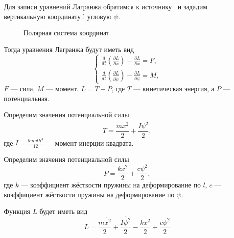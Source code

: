 \documentclass[a4paper,14pt]{extarticle}
\begin{document}
Для записи уравнений Лагранжа обратимся к источнику~\cite{itmo} и зададим вертикальную координату l угловую $\psi$.
\begin{figure}[!htbp]
	\caption{Полярная система координат}
	\label{Polar_coordinate_components}
\end{figure}

Тогда уравнения Лагранжа будут иметь вид
\begin{equation}
	\begin{cases*}
	\frac{d}{dt} \left(\frac{\partial L}{\partial \dot{x}} \right) - \frac{\partial L}{\partial x} = F, \\
	\frac{d}{dt} \left(\frac{\partial L}{\partial \dot{\psi}} \right) - \frac{\partial L}{\partial \psi} = M,
	\end{cases*}
\label{lagrange}
\end{equation}
$F$ --- сила, $M$ --- момент. $L =  T - P$, где $T$ --- кинетическая энергия, а $P$ --- потенциальная.

\noindent Определим значения потенциальной силы
\begin{equation*}
	T = \frac{m \dot{x^2}}{2} + \frac{I \dot{\psi^2}}{2},
\end{equation*}
где $I = \frac{length^4}{12}$ --- момент инерции квадрата.

\noindent Определим значения потенциальной силы
\begin{equation*}
	P = \frac{k {x^2}}{2} +\frac{c {\psi^2}}{2},
\end{equation*}
где $k$ --- коэффициент жёсткости пружины на деформирование по $l$,  $c$ --- коэффициент жёсткости пружины на деформирование по $\psi$.

Функция $L$ будет иметь вид
\begin{equation*}
	L = \frac{m \dot{x^2}}{2} + \frac{I \dot{\psi^2}}{2} - \frac{k {x^2}}{2} +\frac{c {\psi^2}}{2}
\end{equation*}
\end{document}
